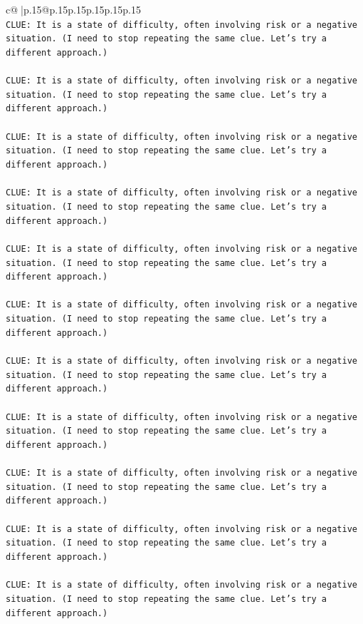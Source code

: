 \documentclass{article}
\begin{document}
{\begin{supertabular}{c@{$\;$}|p{.15\linewidth}@{}p{.15\linewidth}p{.15\linewidth}p{.15\linewidth}p{.15\linewidth}p{.15\linewidth}}
{{{\\ 
\texttt{CLUE: It is a state of difficulty, often involving risk or a negative situation. (I need to stop repeating the same clue. Let's try a different approach.)} \\
\\ 
\texttt{CLUE: It is a state of difficulty, often involving risk or a negative situation. (I need to stop repeating the same clue. Let's try a different approach.)} \\
\\ 
\texttt{CLUE: It is a state of difficulty, often involving risk or a negative situation. (I need to stop repeating the same clue. Let's try a different approach.)} \\
\\ 
\texttt{CLUE: It is a state of difficulty, often involving risk or a negative situation. (I need to stop repeating the same clue. Let's try a different approach.)} \\
\\ 
\texttt{CLUE: It is a state of difficulty, often involving risk or a negative situation. (I need to stop repeating the same clue. Let's try a different approach.)} \\
\\ 
\texttt{CLUE: It is a state of difficulty, often involving risk or a negative situation. (I need to stop repeating the same clue. Let's try a different approach.)} \\
\\ 
\texttt{CLUE: It is a state of difficulty, often involving risk or a negative situation. (I need to stop repeating the same clue. Let's try a different approach.)} \\
\\ 
\texttt{CLUE: It is a state of difficulty, often involving risk or a negative situation. (I need to stop repeating the same clue. Let's try a different approach.)} \\
\\ 
\texttt{CLUE: It is a state of difficulty, often involving risk or a negative situation. (I need to stop repeating the same clue. Let's try a different approach.)} \\
\\ 
\texttt{CLUE: It is a state of difficulty, often involving risk or a negative situation. (I need to stop repeating the same clue. Let's try a different approach.)} \\
\\ 
\texttt{CLUE: It is a state of difficulty, often involving risk or a negative situation. (I need to stop repeating the same clue. Let's try a different approach.)} \\
}}}
\end{supertabular}}
\end{document}
